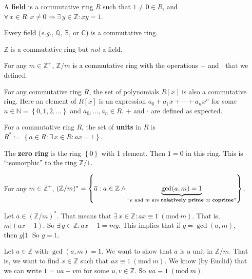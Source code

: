 \documentclass{notes}
\begin{document}
\begin{rmk}
  A {\boldmath \bfseries field} is a commutative ring $R$ such that $1 \neq 0 \in R$, and $\forall \, x \in R: x \neq 0 \Rightarrow \exists \, y \in \mathbb Z: x y = 1$.
\end{rmk}

\begin{eg}
  Every field (\textit{e.g.}, $\mathbb Q$, $\mathbb R$, or $\mathbb C$) is a commutative ring.
\end{eg}

\begin{eg}
  $\mathbb Z$ is a commutative ring but \textit{not} a field.
\end{eg}

\begin{eg}
  For any $m \in \mathbb Z^+$, $\mathbb Z / m$ is a commutative ring with the operations $+$ and $\cdot$ that we defined.
\end{eg}

\begin{eg}
  For any commutative ring $R$, the set of polynomials $R[x]$ is also a commutative ring.
  Here an element of $R[x]$ is an expression $a_0 + a_1 x + \cdots + a_n x^n$ for some $n \in \mathbb N = \left \{ 0, 1, 2, \dots \right \}$ and $a_0, \dots, a_n \in R$.
  $+$ and $\cdot$ are defined as expected.
\end{eg}

\begin{defn}
  For a commutative ring $R$, the set of {\boldmath \bfseries units} in $R$ is $R^* := \left \{ a \in R : \exists \, x \in R: a x = 1 \right \}$.
\end{defn}

\begin{eg}
  The {\boldmath \bfseries zero ring} is the ring $\left \{ 0 \right \}$ with 1 element.
  Then $1 = 0$ in this ring.
  This is ``isomorphic'' to the ring $\mathbb Z / 1$.
\end{eg}

\newpage

\begin{lem}
  For any $m \in \mathbb Z^+$, $(\mathbb Z / m)^* = \left \{ \overline a : a \in \mathbb Z \wedge \underbrace{\gcd(a, m) = 1}_\text{``$a$ and $m$ are {\boldmath \bfseries relatively prime} or {\boldmath \bfseries coprime}''} \right \}$.
\end{lem}

\begin{prf}
  Let $\overline a \in (\mathbb Z / m)^*$.
  That means that $\exists \, x \in \mathbb Z: a x \equiv 1\ (\mathrm{mod}\ m)$.
  That is, $m \vert (a x - 1)$.
  So $\exists \, y \in \mathbb Z: a x - 1 = m y$.
  This implies that if $g = \gcd(a, m)$, then $g \vert 1$.
  So $g = 1$.

  Let $a \in \mathbb Z$ with $\gcd(a, m) = 1$.
  We want to show that $\overline a$ is a unit in $\mathbb Z / m$.
  That is, we want to find $x \in \mathbb Z$ such that $a x \equiv 1\ (\mathrm{mod}\ m)$.
  We know (by Euclid) that we can write $1 = u a + v m$ for some $u, v \in \mathbb Z$.
  So $u a \equiv 1\ (\mathrm{mod}\ m)$.
\end{prf}
\end{document}
